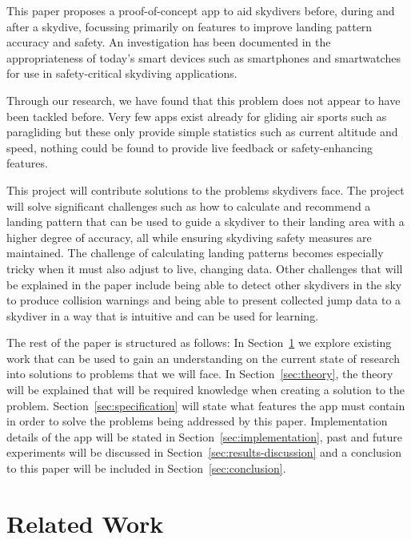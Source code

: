 \documentclass[11pt, a4paper, twocolumn]{article}
\begin{document}
This paper proposes a proof-of-concept app to aid skydivers before, during and after a skydive, focussing primarily on features to improve landing pattern accuracy and safety.
An investigation has been documented in the appropriateness of today's smart devices such as smartphones and smartwatches for use in safety-critical skydiving applications.

Through our research, we have found that this problem does not appear to have been tackled before. Very few apps exist already for gliding air sports such as paragliding but these only provide simple statistics such as current altitude and speed, nothing could be found to provide live feedback or safety-enhancing features.

This project will contribute solutions to the problems skydivers face. The project will solve significant challenges such as how to calculate and recommend a landing pattern that can be used to guide a skydiver to their landing area with a higher degree of accuracy, all while ensuring skydiving safety measures are maintained. The challenge of calculating landing patterns becomes especially tricky when it must also adjust to live, changing data. Other challenges that will be explained in the paper include being able to detect other skydivers in the sky to produce collision warnings and being able to present collected jump data to a skydiver in a way that is intuitive and can be used for learning.

The rest of the paper is structured as follows: In Section~\ref{sec:related-work} we explore existing work that can be used to gain an understanding on the current state of research into solutions to problems that we will face. In Section~\ref{sec:theory}, the theory will be explained that will be required knowledge when creating a solution to the problem. Section~\ref{sec:specification} will state what features the app must contain in order to solve the problems being addressed by this paper. Implementation details of the app will be stated in Section~\ref{sec:implementation}, past and future experiments will be discussed in Section~\ref{sec:results-discussion} and a conclusion to this paper will be included in Section~\ref{sec:conclusion}.


\section{Related Work}\label{sec:related-work}
\end{document}
